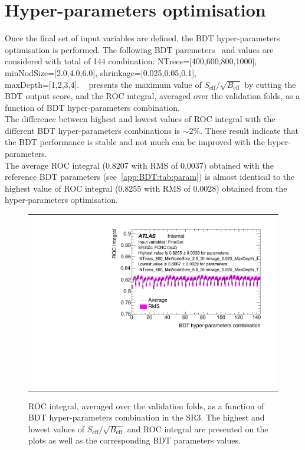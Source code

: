 \section{Hyper-parameters optimisation}
Once the final set of input variables are defined, the BDT hyper-parameters optimisation is performed.
The following BDT paremeters~\cite{TMVA} and values are considered with total of 144 combination:
NTrees=[400,600,800,1000], minNodSize=[2.0,4.0,6.0], shrinkage=[0.025,0.05,0.1],\\ maxDepth=[1,2,3,4].
~ presents the maximum value of $S_{\text{eff}}/\sqrt{B_{\text{eff}}}$ by cutting the BDT output score, and the ROC integral,
averaged over the validation folds, as a function of BDT hyper-parameters combination.\\
The difference between highest and lowest values of ROC integral
with the different BDT hyper-parameters combinations is $\sim2\%$.
These result indicate that the BDT performance is stable and not much can be improved with the hyper-parameters.\\
The average ROC integral (0.8207 with RMS of 0.0037) obtained with the reference BDT parameters (see~\cref{app:BDT:tab:param}) is almost identical to the highest value of ROC integral (0.8255 with RMS of 0.0028) obtained from the hyper-parameters optimisation.

\begin{figure}[!htbp]
	\centering
	\begin{tabular}{c}
		\includegraphics[width=.6\textwidth]{Chapters/CH6/figures/SR3_UsingSMT/BDT/FinalSet/HPO/ROC_integral}
	\end{tabular}
	\caption{ROC integral, averaged over the validation folds,
		as a function of BDT hyper-parameters combination in the SR3. The highest and lowest values of $S_{\text{eff}}/\sqrt{B_{\text{eff}}}$ and ROC integral are presented on the plots as well as
		the corresponding BDT parameters values.}
	\label{app:BDT:fig:SR3:HPO}
\end{figure}


